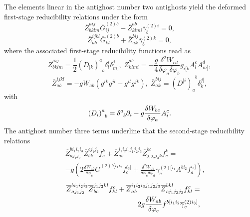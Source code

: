 \documentclass[a4paper,12pt]{article}
\begin{document}
The elements linear in the antighost number two antighosts yield the
deformed first-stage reducibility relations under the form 
\begin{equation}
\overline{Z}_{bklm}^{aij}\overline{G}_{ij}^{(2)b}+\overline{Z}_{klmi}^{ab}%
\overline{\gamma }_{b}^{(2)i}=0,  \label{xx103}
\end{equation}
\begin{equation}
\overline{Z}_{ab}^{ijkl}\overline{G}_{kl}^{(2)b}+\overline{Z}_{ak}^{bij}%
\overline{\gamma }_{b}^{(2)k}=0,  \label{xx104}
\end{equation}
where the associated first-stage reducibility functions read as 
\begin{equation}
\overline{Z}_{bklm}^{aij}=\frac{1}{2}\left( D_{[k}\right) _{\;\;b}^{a}\delta
_{l}^{i}\delta _{m]}^{j},\;\overline{Z}_{klmi}^{ab}=-\frac{g}{4}\frac{\delta
^{2}W_{cd}}{\delta \varphi _{a}\delta \varphi _{b}}%
g_{i[k}A_{l}^{c}A_{m]}^{d},  \label{xx105}
\end{equation}
\begin{equation}
\overline{Z}_{ab}^{ijkl}=-gW_{ab}\left( g^{ik}g^{jl}-g^{il}g^{jk}\right) ,\;%
\overline{Z}_{ak}^{bij}=\left( D^{[i}\right) _{a}^{\;\;b}\delta _{k}^{j]},
\label{xx106}
\end{equation}
with 
\begin{equation}
\left( D_{i}\right) _{\;\;b}^{a}=\delta _{\;\;b}^{a}\partial _{i}-g\frac{%
\delta W_{bc}}{\delta \varphi _{a}}A_{i}^{c}.  \label{xx107}
\end{equation}
The antighost number three terms underline that the second-stage
reducibility relations 
\begin{eqnarray}
&&\overline{Z}_{aj_{1}j_{2}}^{bi_{1}i_{2}i_{3}}\overline{Z}%
_{bk}^{cj_{1}j_{2}}f_{c}^{k}+\overline{Z}%
_{ab}^{i_{1}i_{2}i_{3}j_{1}j_{2}j_{3}}\overline{Z}%
_{j_{1}j_{2}j_{3}k}^{bc}f_{c}^{k}=  \nonumber \\
&&-g\left( 2\frac{\delta W_{ab}}{\delta \varphi _{c}}\overline{G}%
^{(2)b[i_{1}i_{2}}f_{c}^{i_{3}]}+\frac{\delta ^{2}W_{ab}}{\delta \varphi
_{c}\delta \varphi _{d}}\overline{\gamma }%
_{c}^{(2)[i_{1}}A^{bi_{2}}f_{d}^{i_{3}]}\right) ,  \label{xx108}
\end{eqnarray}
\begin{eqnarray}
&&\overline{Z}_{aj_{1}j_{2}}^{bi_{1}i_{2}i_{3}}\overline{Z}%
_{bc}^{j_{1}j_{2}kl}f_{kl}^{c}+\overline{Z}%
_{ab}^{i_{1}i_{2}i_{3}j_{1}j_{2}j_{3}}\overline{Z}%
_{cj_{1}j_{2}j_{3}}^{bkl}f_{kl}^{c}=  \nonumber \\
&&2g\frac{\delta W_{ab}}{\delta \varphi _{c}}f^{b[i_{1}i_{2}}\overline{%
\gamma }_{c}^{(2)i_{3}]},  \label{xx109}
\end{eqnarray}
\end{document}
